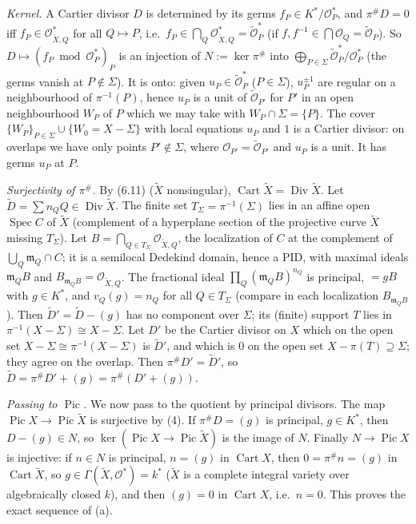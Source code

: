 \documentclass[11pt]{article}
\begin{document}
\emph{Kernel.} A Cartier divisor $D$ is determined by its germs $f_P\in K^*/\mathcal O_P^*$, and $\pi^\#D=0$ iff $f_P\in\mathcal O_{\tilde X,Q}^*$ for all $Q\mapsto P$, i.e.\ $f_P\in\bigcap_Q\mathcal O_{\tilde X,Q}^*=\tilde{\mathcal O}_P^*$ (if $f,f^{-1}\in\bigcap\mathcal O_Q=\tilde{\mathcal O}_P$). So $D\mapsto(f_P\bmod\mathcal O_P^*)_P$ is an injection of $N:=\ker\pi^\#$ into $\bigoplus_{P\in\Sigma}\tilde{\mathcal O}_P^*/\mathcal O_P^*$ (the germs vanish at $P\notin\Sigma$). It is onto: given $u_P\in\tilde{\mathcal O}_P^*$ ($P\in\Sigma$), $u_P^{\pm1}$ are regular on a neighbourhood of $\pi^{-1}(P)$, hence $u_P$ is a unit of $\tilde{\mathcal O}_{P'}$ for $P'$ in an open neighbourhood $W_P$ of $P$ which we may take with $W_P\cap\Sigma=\{P\}$. The cover $\{W_P\}_{P\in\Sigma}\cup\{W_0=X-\Sigma\}$ with local equations $u_P$ and $1$ is a Cartier divisor: on overlaps we have only points $P'\notin\Sigma$, where $\mathcal O_{P'}=\tilde{\mathcal O}_{P'}$ and $u_P$ is a unit. It has germs $u_P$ at $P$.

\emph{Surjectivity of $\pi^\#$.} By (6.11) ($\tilde X$ nonsingular), $\operatorname{Cart}\tilde X=\operatorname{Div}\tilde X$. Let $\tilde D=\sum n_QQ\in\operatorname{Div}\tilde X$. The finite set $T_\Sigma=\pi^{-1}(\Sigma)$ lies in an affine open $\operatorname{Spec}C$ of $\tilde X$ (complement of a hyperplane section of the projective curve $\tilde X$ missing $T_\Sigma$). Let $B=\bigcap_{Q\in T_\Sigma}\mathcal O_{\tilde X,Q}$, the localization of $C$ at the complement of $\bigcup_Q\mathfrak m_Q\cap C$; it is a semilocal Dedekind domain, hence a PID, with maximal ideals $\mathfrak m_QB$ and $B_{\mathfrak m_QB}=\mathcal O_{\tilde X,Q}$. The fractional ideal $\prod_Q(\mathfrak m_QB)^{n_Q}$ is principal, $=gB$ with $g\in K^*$, and $v_Q(g)=n_Q$ for all $Q\in T_\Sigma$ (compare in each localization $B_{\mathfrak m_QB}$). Then $\tilde D'=\tilde D-(g)$ has no component over $\Sigma$; its (finite) support $T$ lies in $\pi^{-1}(X-\Sigma)\cong X-\Sigma$. Let $D'$ be the Cartier divisor on $X$ which on the open set $X-\Sigma\cong\pi^{-1}(X-\Sigma)$ is $\tilde D'$, and which is $0$ on the open set $X-\pi(T)\supseteq\Sigma$; they agree on the overlap. Then $\pi^\#D'=\tilde D'$, so $\tilde D=\pi^\#D'+(g)=\pi^\#(D'+(g))$.

\emph{Passing to $\operatorname{Pic}$.} We now pass to the quotient by principal divisors. The map $\operatorname{Pic}X\to\operatorname{Pic}\tilde X$ is surjective by (4). If $\pi^\#D=(g)$ is principal, $g\in K^*$, then $D-(g)\in N$, so $\ker(\operatorname{Pic}X\to\operatorname{Pic}\tilde X)$ is the image of $N$. Finally $N\to\operatorname{Pic}X$ is injective: if $n\in N$ is principal, $n=(g)$ in $\operatorname{Cart}X$, then $0=\pi^\#n=(g)$ in $\operatorname{Cart}\tilde X$, so $g\in\Gamma(\tilde X,\mathcal O^*)=k^*$ ($\tilde X$ is a complete integral variety over algebraically closed $k$), and then $(g)=0$ in $\operatorname{Cart}X$, i.e.\ $n=0$. This proves the exact sequence of (a).
\end{document}
